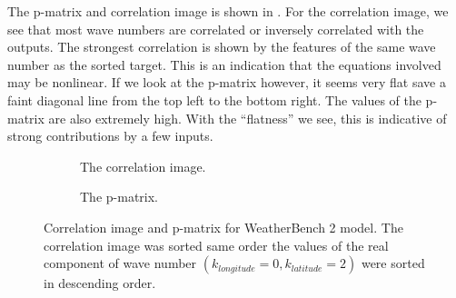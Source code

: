 The p-matrix and correlation image is shown in . For the correlation image, we see that most wave numbers are correlated or inversely correlated with the outputs. The strongest correlation is shown by the features of the same wave number as the sorted target. This is an indication that the equations involved may be nonlinear. If we look at the p-matrix however, it seems very flat save a faint diagonal line from the top left to the bottom right. The values of the p-matrix are also extremely high. With the \enquote{flatness} we see, this is indicative of strong contributions by a few inputs.
\begin{figure}[H]
  \centering
  \begin{subfigure}{0.49\linewidth}
    \begin{adjustbox}{width=\linewidth}
      
    \end{adjustbox}
    \caption{The correlation image.}\label{fig:sc3_ci}
  \end{subfigure}
  \begin{subfigure}{0.49\linewidth}
    \begin{adjustbox}{width=\linewidth}
      
    \end{adjustbox}
    \caption{The p-matrix.}\label{fig:sc3_pm}
  \end{subfigure}
  \caption{Correlation image and p-matrix for WeatherBench 2 model. The correlation image was sorted same order the values of the real component of wave number \((k_{longitude}=0, k_{latitude}=2)\) were sorted in descending order.}\label{fig:sc3_interpretation}
\end{figure}


